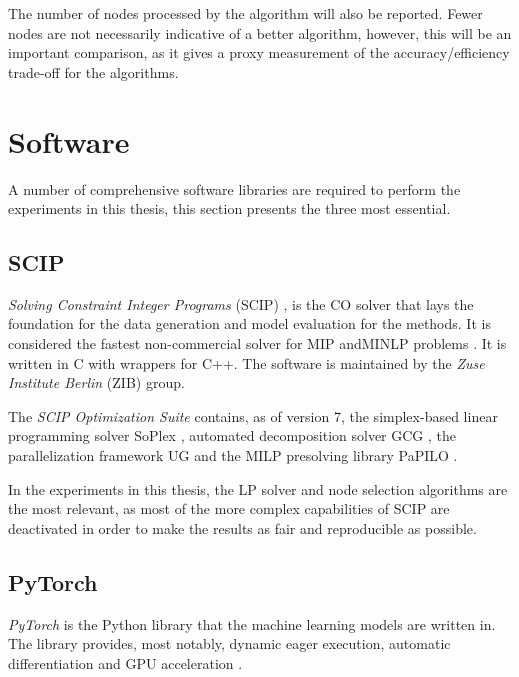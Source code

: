 The number of nodes processed by the algorithm will also be reported. Fewer nodes are not necessarily indicative of a better algorithm, however, this will be an important comparison, as it gives a proxy measurement of the accuracy/efficiency trade-off for the algorithms. 





\section{Software}

A number of comprehensive software libraries are required to perform the experiments in this thesis, this section presents the three most essential.  


\subsection{SCIP}

\textit{Solving Constraint Integer Programs }(\gls{SCIP})
\cite{achterberg2009scip}, is the \gls{CO} solver that lays the foundation for the data generation and model evaluation for the methods. It is considered the fastest non-commercial solver for \gls{MIP} and\gls{MINLP} problems \cite{gamrath2020scip}. It is written in C with wrappers for C++. The software is maintained by the\textit{ Zuse Institute Berlin} (ZIB) group. 

The \textit{SCIP Optimization Suite} contains, as of version 7, the simplex-based linear programming solver SoPlex \cite{wunderling1996soplex}, automated decomposition solver GCG \cite{gamrath2010gcg}, the parallelization framework UG \cite{shinano2018ug} and the \gls{MILP} presolving library PaPILO \cite{gamrath2020scip}.

In the experiments in this thesis, the LP solver and node selection algorithms are the most relevant, as most of the more complex capabilities of \gls{SCIP} are deactivated in order to make the results as fair and reproducible as possible. 





\subsection{PyTorch}

\textit{PyTorch} is the Python library that the machine learning models are written in. The library provides, most notably, dynamic eager execution, automatic differentiation and \gls{GPU} acceleration \cite{paszke2019pytorch}. 

